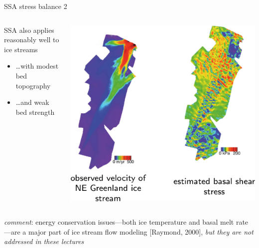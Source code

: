 \begin{frame}{SSA stress balance 2}

\begin{columns}
\begin{column}{0.55\textwidth}
SSA also applies reasonably well to ice streams
\begin{itemize}
\item \dots with modest bed topography
\item \dots and weak bed strength
\end{itemize}
\end{column}

\begin{column}{0.45\textwidth}
  \includegraphics[width=1.0\textwidth]{photos/NEgreenlandJoughin}
\end{column}
\end{columns}

\bigskip\bigskip
\small
\emph{comment}:  energy conservation issues---both ice temperature and basal melt rate---are a major part of ice stream flow modeling [Raymond, 2000]\nocite{Raymondenergy}, \emph{but they are not addressed in these lectures}
\end{frame}


